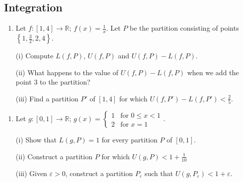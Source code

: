 \documentclass[letterpaper,10pt,english]{jupyterBook}
\begin{document}
\subsection{Integration}
\label{\detokenize{Problems:integration}}\label{\detokenize{Problems:id66}}\begin{enumerate}
%
\setcounter{enumi}{65}
\item {} 
\sphinxAtStartPar
Let \(f:[1,4]\to\mathbb{R}\); \(\displaystyle f(x)=\frac{1}{x}\). Let \(P\) be the partition consisting of points \(\left\{1,\frac{3}{2},2,4\right\}\).

\sphinxAtStartPar
(i) Compute \(L(f,P)\), \(U(f,P)\) and \(U(f,P)-L(f,P)\).

\sphinxAtStartPar
(ii) What happens to the value of \(U(f,P)-L(f,P)\) when we add the point \(3\) to the partition?

\sphinxAtStartPar
(iii) Find a partition \(P'\) of \([1,4]\) for which \(U(f,P')-L(f,P')<\frac{2}{5}\).

\end{enumerate}
\label{\detokenize{Problems:id67}}\begin{enumerate}
%
\setcounter{enumi}{66}
\item {} 
\sphinxAtStartPar
Let \(g:[0,1]\to\mathbb{R}\); \(\displaystyle g(x)=\left\{\begin{array}{cc} 1 & \text{for } 0\leq x<1 \\ 2 &\text{for } x=1 \end{array}\right.\).

\sphinxAtStartPar
(i) Show that \(L(g,P)=1\) for every partition \(P\) of \([0,1]\).

\sphinxAtStartPar
(ii) Construct a partition \(P\) for which \(U(g,P)<1+\frac{1}{10}\)

\sphinxAtStartPar
(iii) Given \(\varepsilon>0\), construct a partition \(P_\varepsilon\) such that \(U(g,P_\varepsilon)<1+\varepsilon\).

\end{enumerate}
\end{document}
